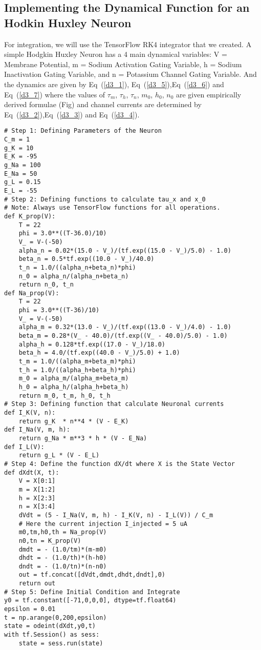 \documentclass[10pt,letterpaper]{article}
\begin{document}
\subsection*{Implementing the Dynamical Function for an Hodkin Huxley Neuron}

For integration, we will use the TensorFlow RK4 integrator that we created. A simple Hodgkin Huxley Neuron has a 4 main dynamical variables: V = Membrane Potential, m = Sodium Activation Gating Variable, h = Sodium Inactivation Gating Variable, and n = Potassium Channel Gating Variable. And the dynamics are given by Eq~(\ref{d3_1}), Eq~(\ref{d3_5}),Eq~(\ref{d3_6}) and Eq~(\ref{d3_7}) where the values of $\tau_m$, $\tau_h$, $\tau_n$, $m_0$, $h_0$, $n_0$ are given empirically derived formulae (Fig) and channel currents are determined by Eq~(\ref{d3_2}),Eq~(\ref{d3_3}) and Eq~(\ref{d3_4}).

\begin{verbatim}
# Step 1: Defining Parameters of the Neuron 
C_m = 1
g_K = 10
E_K = -95
g_Na = 100
E_Na = 50 
g_L = 0.15
E_L = -55
# Step 2: Defining functions to calculate tau_x and x_0
# Note: Always use TensorFlow functions for all operations.
def K_prop(V):
    T = 22
    phi = 3.0**((T-36.0)/10)
    V_ = V-(-50)
    alpha_n = 0.02*(15.0 - V_)/(tf.exp((15.0 - V_)/5.0) - 1.0)
    beta_n = 0.5*tf.exp((10.0 - V_)/40.0) 
    t_n = 1.0/((alpha_n+beta_n)*phi)
    n_0 = alpha_n/(alpha_n+beta_n)
    return n_0, t_n
def Na_prop(V):
    T = 22
    phi = 3.0**((T-36)/10)
    V_ = V-(-50)
    alpha_m = 0.32*(13.0 - V_)/(tf.exp((13.0 - V_)/4.0) - 1.0)
    beta_m = 0.28*(V_ - 40.0)/(tf.exp((V_ - 40.0)/5.0) - 1.0)
    alpha_h = 0.128*tf.exp((17.0 - V_)/18.0)
    beta_h = 4.0/(tf.exp((40.0 - V_)/5.0) + 1.0)
    t_m = 1.0/((alpha_m+beta_m)*phi)
    t_h = 1.0/((alpha_h+beta_h)*phi)
    m_0 = alpha_m/(alpha_m+beta_m)
    h_0 = alpha_h/(alpha_h+beta_h)
    return m_0, t_m, h_0, t_h
# Step 3: Defining function that calculate Neuronal currents
def I_K(V, n):
    return g_K  * n**4 * (V - E_K)
def I_Na(V, m, h):
    return g_Na * m**3 * h * (V - E_Na)
def I_L(V):
    return g_L * (V - E_L)
# Step 4: Define the function dX/dt where X is the State Vector
def dXdt(X, t):
    V = X[0:1]
    m = X[1:2]
    h = X[2:3]
    n = X[3:4]
    dVdt = (5 - I_Na(V, m, h) - I_K(V, n) - I_L(V)) / C_m 
    # Here the current injection I_injected = 5 uA
    m0,tm,h0,th = Na_prop(V)
    n0,tn = K_prop(V)
    dmdt = - (1.0/tm)*(m-m0)
    dhdt = - (1.0/th)*(h-h0)
    dndt = - (1.0/tn)*(n-n0)
    out = tf.concat([dVdt,dmdt,dhdt,dndt],0)
    return out
# Step 5: Define Initial Condition and Integrate
y0 = tf.constant([-71,0,0,0], dtype=tf.float64)
epsilon = 0.01
t = np.arange(0,200,epsilon)
state = odeint(dXdt,y0,t)
with tf.Session() as sess:
    state = sess.run(state)
\end{verbatim}
\end{document}
